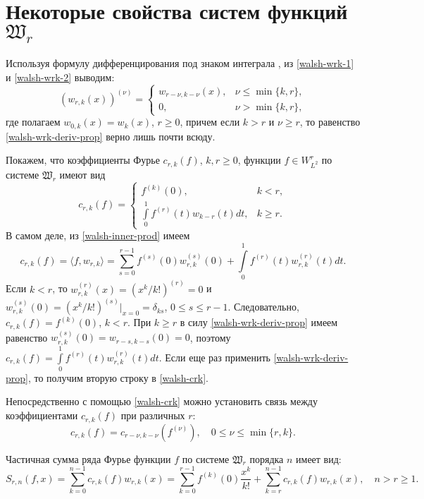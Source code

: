 \section{Некоторые свойства систем функций $\mathfrak{W}_r$}\label{walsh-sec-Wr-props}
Используя формулу дифференцирования под знаком интеграла \cite{walsh-fiht2}, из \eqref{walsh-wrk-1} и \eqref{walsh-wrk-2} выводим:
\begin{equation}\label{walsh-wrk-deriv-prop}
(w_{r,k}(x))^{(\nu)} =
\begin{cases}
w_{r-\nu,k-\nu}(x), &\nu \le \min\{k,r\},\\
0, &\nu > \min\{k,r\},
\end{cases}
\end{equation}
где полагаем $w_{0,k}(x)=w_{k}(x)$, $r \ge 0$, причем если $k > r$ и $\nu \ge r$, то равенство \eqref{walsh-wrk-deriv-prop} верно лишь почти всюду.

Покажем, что коэффициенты Фурье $c_{r,k}(f)$, $k, r \ge 0$, функции $f \in W^r_{L^2}$ по системе $\mathfrak{W}_r$ имеют вид
\begin{equation}\label{walsh-crk}
c_{r,k}(f)=
\begin{cases}
f^{(k)}(0), &k<r,\\
\int\limits_{0}^{1}f^{(r)}(t)w_{k-r}(t)dt, &k \ge r.
\end{cases}
\end{equation}
В самом деле, из \eqref{walsh-inner-prod} имеем
\begin{equation*}
c_{r,k}(f)=\langle f, w_{r,k} \rangle =
\sum\limits_{s=0}^{r-1}f^{(s)}(0)w^{(s)}_{r,k}(0)+\int\limits_{0}^{1}f^{(r)}(t)w^{(r)}_{r,k}(t)dt.
\end{equation*}
Если $k < r$, то $w^{(r)}_{r,k}(x)=(x^k/k!)^{(r)}=0$ и $w^{(s)}_{r,k}(0)=(x^k/k!)^{(s)}\big|_{x=0}=\delta_{ks}$, $0 \le s \le r-1$. Следовательно, $c_{r,k}(f)=f^{(k)}(0)$, $k < r$. При $k \ge r$ в силу \eqref{walsh-wrk-deriv-prop} имеем равенство $w^{(s)}_{r,k}(0)=w_{r-s,k-s}(0)=0$, поэтому $c_{r,k}(f)=\int\limits_{0}^{1}f^{(r)}(t)w^{(r)}_{r,k}(t)dt$. Если еще раз применить \eqref{walsh-wrk-deriv-prop}, то получим вторую строку в \eqref{walsh-crk}.

Непосредственно с помощью \eqref{walsh-crk} можно установить связь между коэффициентами $c_{r,k}(f)$ при различных $r$:
\begin{equation}\label{walsh-crk-deriv}
c_{r,k}(f)=c_{r-\nu,k-\nu}(f^{(\nu)}), \quad 0 \le \nu \le \min\{r,k\}.
\end{equation}

Частичная сумма ряда Фурье функции $f$ по системе $\mathfrak{W}_r$ порядка $n$ имеет вид:
\begin{equation*}
S_{r,n}(f,x)=
\sum_{k=0}^{n-1}c_{r,k}(f)w_{r,k}(x)=
\sum_{k=0}^{r-1}f^{(k)}(0)\frac{x^k}{k!}+
\sum_{k=r}^{n-1}c_{r,k}(f)w_{r,k}(x), \quad n > r \ge 1.
\end{equation*}

